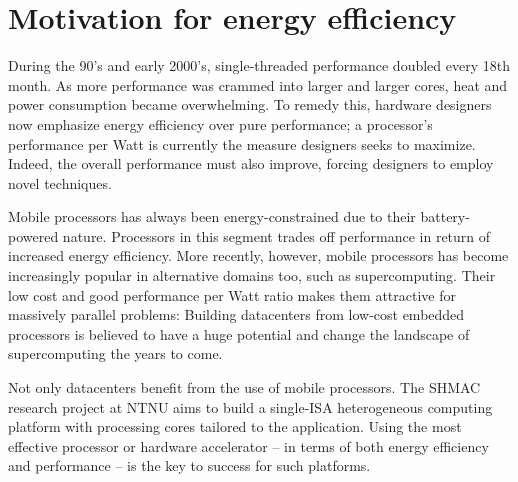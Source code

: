\section{Motivation for energy efficiency}

During the 90's and early 2000's, single-threaded performance doubled every 18th
month. As more performance was crammed into larger and larger cores, heat and
power consumption became overwhelming. To remedy this, hardware designers now
emphasize energy efficiency over pure performance; a processor's performance per
Watt is currently the measure designers seeks to maximize. Indeed, the overall
performance must also improve, forcing designers to employ novel techniques.

Mobile processors has always been energy-constrained due to their
battery-powered nature. Processors in this segment trades off performance in
return of increased energy efficiency. More recently, however, mobile processors
has become increasingly popular in alternative domains too, such as
supercomputing.  Their low cost and good performance per Watt ratio makes them
attractive for massively parallel problems: Building datacenters from low-cost
embedded processors is believed to have a huge potential and change the
landscape of supercomputing the years to come.

Not only datacenters benefit from the use of mobile processors. The SHMAC
research project at NTNU aims to build a single-ISA heterogeneous computing
platform with processing cores tailored to the application. Using the most
effective processor or hardware accelerator -- in terms of both energy efficiency
and performance -- is the key to success for such platforms.


